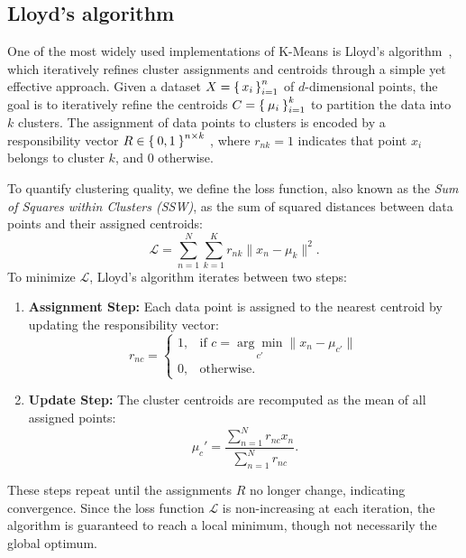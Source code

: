\documentclass[10pt,twocolumn,letterpaper]{article}
\begin{document}

\subsection{Lloyd's algorithm}\label{subsec:procedure-and-lloyd's-algorithm}

One of the most widely used implementations of K-Means is Lloyd’s
algorithm~\cite{deuschle2019}, which iteratively refines cluster assignments
and centroids through a simple yet effective approach. Given a dataset
$X=\set{x_i}_{i=1}^n$ of $d$-dimensional points, the goal is to iteratively
refine the centroids $C=\Set{\mu_i}_{i=1}^k$ to partition the data into $k$
clusters. The assignment of data points to clusters is encoded by a
responsibility vector $R\in\Set{0,1}^{n\times k}$ , where $r_{nk}=1$ indicates
that point $x_i$ belongs to cluster $k$, and $0$ otherwise.

To quantify clustering quality, we define the loss function, also known as the
\textit{Sum of Squares within Clusters (SSW)}, as the sum of squared distances
between data points and their assigned centroids:
\begin{equation}
    \label{eq:lloyds-loss}
    \mathcal{L} = \sum_{n=1}^{N} \sum_{k=1}^{K} r_{nk} \|x_n - \mu_k\|^2.
\end{equation}
To minimize $\mathcal{L}$, Lloyd's algorithm iterates between two steps:
\begin{enumerate}
    \item \textbf{Assignment Step:} Each data point is assigned to the nearest centroid by updating the responsibility vector:
          \begin{equation}
              \label{eq:lloyds-res-vec}
              r_{nc} =
              \begin{cases}
                  1, & \text{if } c = \underset{c'}{\arg\min} \|x_n - \mu_{c'}\| \\
                  0, & \text{otherwise.}
              \end{cases}
          \end{equation}
    \item \textbf{Update Step:} The cluster centroids are recomputed as the mean of all assigned points:
          \begin{equation}
              \label{eq:min-lloyds-loss}
              \mu_c' = \frac{\sum_{n=1}^{N} r_{nc} x_n}{\sum_{n=1}^{N} r_{nc}}.
          \end{equation}
\end{enumerate}
These steps repeat until the assignments $R$ no longer change, indicating
convergence. Since the loss function $\mathcal{L}$ is non-increasing at each
iteration, the algorithm is guaranteed to reach a local minimum, though not
necessarily the global optimum.
\end{document}
